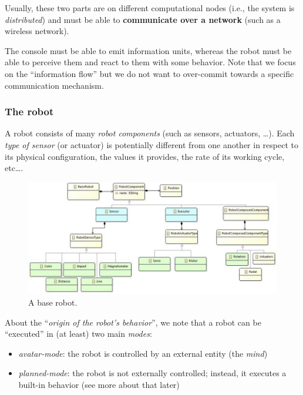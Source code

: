 \documentclass[11pt]{article}
\begin{document}
  Usually, these two parts are on different computational nodes (i.e., the
  system is \emph{distributed}) and must be able to
  \textbf{communicate over a network} (such as a wireless network).
    
  The console must be able to emit information units, whereas the robot must be
  able to perceive them and react to them with some behavior.   
  Note that we focus on the ``information flow'' but we do not want to
    over-commit towards a specific communication mechanism.
  
\subsubsection{The robot}  
  
  A robot consists of many \emph{robot components} (such as sensors, actuators,
  \ldots).
    Each \emph{type of sensor} (or actuator) is potentially different from one
    another in respect to its physical configuration, the values it provides, the
    rate of its working cycle, etc\ldots .
  
\begin{figure}[H]
    \centering
     \includegraphics[scale=0.60, trim=4cm 0 0
     -1cm]{img/concept_baseRobot.png}
    \caption{A base robot.}
    \label{fig:baserob}
\end{figure}  

  About the ``\emph{origin of the robot's behavior}'', we note that a robot can
  be ``executed'' in (at least) two main \emph{modes}:
\begin{itemize}
  \item \emph{avatar-mode}: the robot is controlled by an external entity
  (the \emph{mind})
  \item \emph{planned-mode}: the robot is not externally controlled; instead, it
  executes a built-in behavior (see more about that later)
\end{itemize}
  
\end{document}
